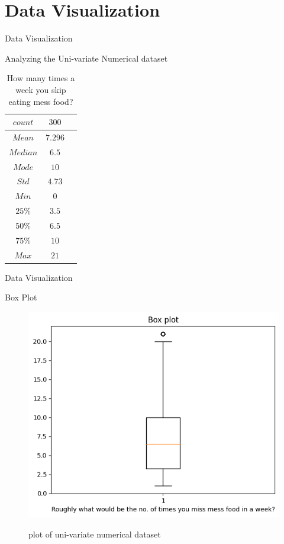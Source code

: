 \documentclass{beamer}
\begin{document}
\section{Data Visualization}
\begin{frame}{Data Visualization}
\begin{block}{Analyzing the Uni-variate Numerical dataset}
    \begin{table}[!h]
    \centering
\caption{How many times a week you skip eating mess food? }
\label{tab:table_label}
    \begin{tabular}{|c|c|c|} 
                 \hline 
        $count$               &$300$     
        
        \\ \hline
        $Mean$   &$7.296$      \\ \hline    
        $Median$    &$6.5$      \\ \hline
        $Mode$       &$10$       \\\hline
        $Std$       &$4.73$ \\\hline
        $Min$       &  $0$ \\\hline
        $25\%$       &$3.5$ \\\hline
        $50\%$       & $6.5$ \\\hline
        $75\%$       &$10$ \\\hline
        $Max$       &$21$ \\ \hline
    \end{tabular}
\end{table}
\end{block}
\end{frame}
\begin{frame}{Data Visualization}
\begin{block}{Box Plot}
\begin{figure}[H]
    \centering
    \caption{plot of uni-variate numerical dataset}
    \includegraphics[scale = 0.55]{boxplot.png} 
    \label{fig:boxplot}
\end{figure}
\end{block}
\end{frame}
\end{document}
